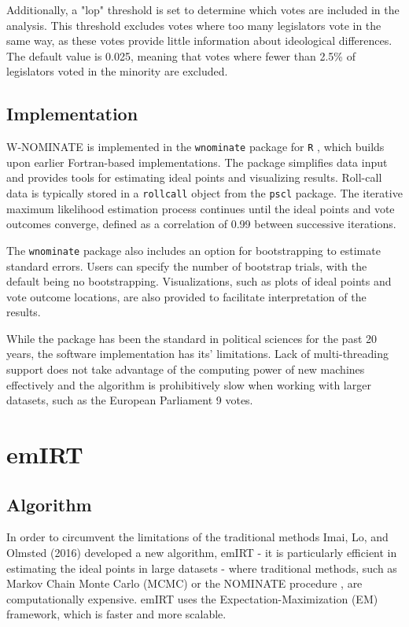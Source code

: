 \documentclass{report}
\begin{document}
                Additionally, a "lop" threshold is set to determine which votes are included in the analysis.
                This threshold excludes votes where too many legislators vote in the same way, as these votes
                provide little information about ideological differences. The default value is 0.025,
                meaning that votes where fewer than 2.5\% of legislators voted in the minority are excluded.

            \subsection{Implementation}
                W-NOMINATE is implemented in the \texttt{wnominate} package for \texttt{R}
                , which builds upon earlier Fortran-based implementations. The package simplifies data input and
                provides tools for estimating ideal points and visualizing results. Roll-call data is typically
                stored in a \texttt{rollcall} object from the \texttt{pscl}
                package. The iterative maximum likelihood estimation process continues until the ideal points
                and vote outcomes converge, defined as a correlation of 0.99 between successive iterations.

                The \texttt{wnominate}
                package also includes an option for bootstrapping to estimate standard errors. Users can specify
                the number of bootstrap trials, with the default being no bootstrapping. Visualizations, such as
                plots of ideal points and vote outcome locations, are also provided to facilitate interpretation
                of the results.

                While the package has been the standard in political sciences for the past 20 years, the software
                implementation has its' limitations. Lack of multi-threading support does not take advantage of the
                computing power of new machines effectively and the algorithm is prohibitively slow when working
                with larger datasets, such as the European Parliament 9 votes.


        \section{emIRT}

            \subsection{Algorithm}
                In order to circumvent the limitations of the traditional methods Imai, Lo, and Olmsted (2016) developed
                a
                new algorithm, emIRT - it is particularly efficient in estimating the ideal points in large datasets -
                where
                traditional methods, such as Markov Chain Monte Carlo
                (MCMC) or the NOMINATE procedure , are computationally expensive. emIRT uses the
                Expectation-Maximization (EM) framework, which is faster and more scalable.
\end{document}
